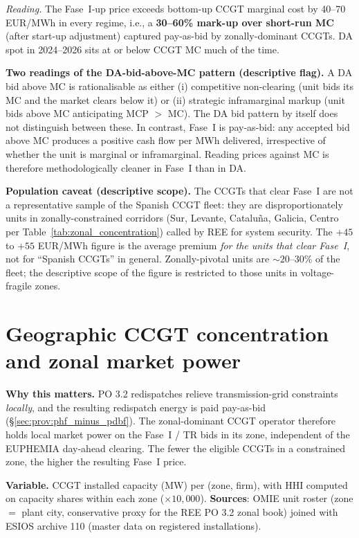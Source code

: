 \documentclass[11pt,a4paper]{article}
\begin{document}
\textit{Reading.} The Fase~I-up price exceeds bottom-up CCGT marginal cost by 40--70 EUR/MWh in every regime, i.e., a \textbf{30--60\% mark-up over short-run MC} (after start-up adjustment) captured pay-as-bid by zonally-dominant CCGTs. DA spot in 2024--2026 sits at or below CCGT MC much of the time.

\textbf{Two readings of the DA-bid-above-MC pattern (descriptive flag).} A DA bid above MC is rationalisable as either (i) competitive non-clearing (unit bids its MC and the market clears below it) or (ii) strategic inframarginal markup (unit bids above MC anticipating MCP $>$ MC). The DA bid pattern by itself does not distinguish between these. In contrast, Fase~I is pay-as-bid: any accepted bid above MC produces a positive cash flow per MWh delivered, irrespective of whether the unit is marginal or inframarginal. Reading prices against MC is therefore methodologically cleaner in Fase~I than in DA.

\textbf{Population caveat (descriptive scope).} The CCGTs that clear Fase~I are not a representative sample of the Spanish CCGT fleet: they are disproportionately units in zonally-constrained corridors (Sur, Levante, Cataluña, Galicia, Centro per Table~\ref{tab:zonal_concentration}) called by REE for system security. The $+45$ to $+55$ EUR/MWh figure is the average premium \emph{for the units that clear Fase~I}, not for ``Spanish CCGTs'' in general. Zonally-pivotal units are $\sim 20$--$30\%$ of the fleet; the descriptive scope of the figure is restricted to those units in voltage-fragile zones.


\section{Geographic CCGT concentration and zonal market power}\label{sec:prov:geo}

\textbf{Why this matters.} PO 3.2 redispatches relieve transmission-grid constraints \emph{locally}, and the resulting redispatch energy is paid pay-as-bid (\S\ref{sec:prov:phf_minus_pdbf}). The zonal-dominant CCGT operator therefore holds local market power on the Fase~I / TR bids in its zone, independent of the EUPHEMIA day-ahead clearing. The fewer the eligible CCGTs in a constrained zone, the higher the resulting Fase~I price.

\textbf{Variable.} CCGT installed capacity (MW) per (zone, firm), with HHI computed on capacity shares within each zone ($\times 10{,}000$). \textbf{Sources}: OMIE unit roster (zone $=$ plant city, conservative proxy for the REE PO 3.2 zonal book) joined with ESIOS archive 110 (master data on registered installations).
\end{document}

